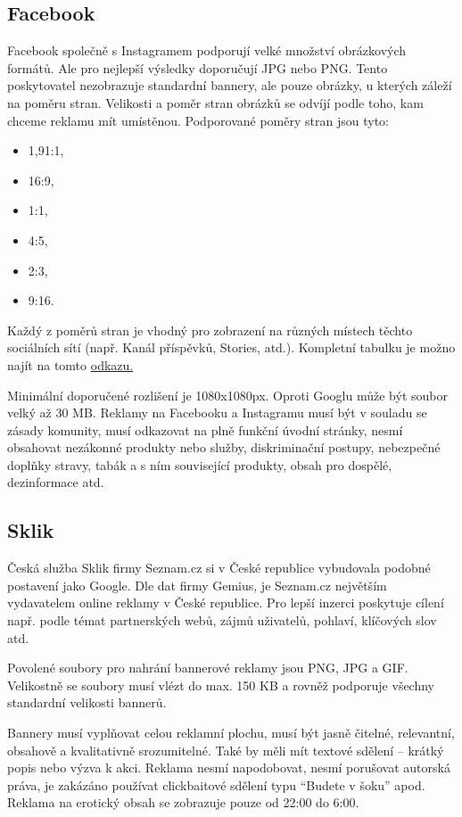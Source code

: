     \subsection{Facebook}
    Facebook společně s Instagramem podporují velké množství obrázkových formátů. Ale pro nejlepší výsledky doporučují JPG nebo PNG.
    Tento poskytovatel nezobrazuje standardní bannery, ale pouze obrázky, u kterých záleží na poměru stran.
    Velikosti a poměr stran obrázků se odvíjí podle toho, kam chceme reklamu mít umístěnou. Podporované poměry stran jsou tyto:
    \begin{itemize}
        \item 1,91:1,
        \item 16:9,
        \item 1:1,
        \item 4:5,
        \item 2:3,
        \item 9:16.
    \end{itemize}

    Každý z poměrů stran je vhodný pro zobrazení na různých místech těchto sociálních sítí (např. Kanál příspěvků, Stories, atd.).
    Kompletní tabulku je možno najít na tomto \href{https://www.facebook.com/business/help/682655495435254?id=271710926837064}{odkazu.}

    Minimální doporučené rozlišení je 1080x1080px. Oproti Googlu může být soubor velký až 30 MB.
    Reklamy na Facebooku a Instagramu musí být v souladu se zásady komunity, musí odkazovat na plně funkční úvodní stránky,
    nesmí obsahovat nezákonné produkty nebo služby, diskriminační postupy, nebezpečné doplňky stravy, tabák a s ním související produkty,
    obsah pro dospělé, dezinformace atd.

    \subsection{Sklik}
    Česká služba Sklik firmy Seznam.cz si v České republice vybudovala podobné postavení jako Google.
    Dle dat firmy Gemius, je Seznam.cz největším vydavatelem online reklamy v České republice. Pro lepší inzerci poskytuje cílení
    např. podle témat partnerských webů, zájmů uživatelů, pohlaví, klíčových slov atd.

    Povolené soubory pro nahrání bannerové reklamy jsou PNG, JPG a GIF. Velikostně se soubory musí vlézt do max. 150 KB a
    rovněž podporuje všechny standardní velikosti bannerů.

    Bannery musí vyplňovat celou reklamní plochu, musí být jasně čitelné, relevantní, obsahově a kvalitativně srozumitelné.
    Také by měli mít textové sdělení -- krátký popis nebo výzva k akci. Reklama nesmí napodobovat, nesmí porušovat autorská práva,
    je zakázáno používat clickbaitové sdělení typu \enquote{Budete v šoku} apod. Reklama na erotický obsah se zobrazuje pouze od 22:00 do 6:00.  

\endinput